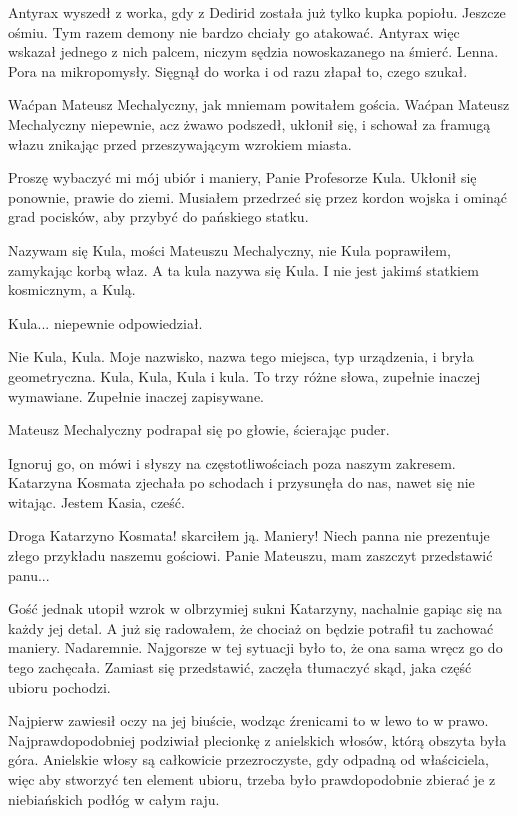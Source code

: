 Antyrax wyszedł z worka, gdy z Dedirid została już tylko kupka popiołu.
Jeszcze ośmiu.
Tym razem demony nie bardzo chciały go atakować.
Antyrax więc wskazał jednego z nich palcem, niczym sędzia nowoskazanego na śmierć.
Lenna. Pora na mikropomysły.
Sięgnął do worka i od razu złapał to, czego szukał.

\divider{}

\ds{} Waćpan Mateusz Mechalyczny, jak mniemam \dm{} powitałem gościa. \dm{} Waćpan Mateusz Mechalyczny niepewnie, acz żwawo podszedł, ukłonił się, i schował za framugą włazu
znikając przed przeszywającym wzrokiem miasta. \de{}

\ds{} Proszę wybaczyć mi mój ubiór i maniery, Panie Profesorze Kula. \dm{} Ukłonił się ponownie, prawie do ziemi. \dm{}
Musiałem przedrzeć się przez kordon wojska i ominąć grad pocisków, aby przybyć do pańskiego statku. \de{}

\ds{} Nazywam się Kula, mości Mateuszu Mechalyczny, nie Kula \dm{} poprawiłem, zamykając korbą właz. \dm{} A ta kula nazywa się Kula. 
I nie jest jakimś statkiem kosmicznym, a Kulą. \de{}

\ds{} Kula... \dm{} niepewnie odpowiedział. \de{}

\ds{} Nie Kula, Kula. Moje nazwisko, nazwa tego miejsca, typ urządzenia, i bryła geometryczna. Kula, Kula, Kula i kula. To trzy różne słowa, zupełnie inaczej wymawiane.
Zupełnie inaczej zapisywane. \de{}

Mateusz Mechalyczny podrapał się po głowie, ścierając puder.

\ds{} Ignoruj go, on mówi i słyszy na częstotliwościach poza naszym zakresem. \dm{} Katarzyna Kosmata zjechała po schodach i przysunęła do nas, nawet się nie witając.
\dm{} Jestem Kasia, cześć. \de{}

\ds{} Droga Katarzyno Kosmata! \dm{} skarciłem ją. \dm{} Maniery! Niech panna nie prezentuje złego przykładu naszemu gościowi. Panie Mateuszu, mam zaszczyt przedstawić panu...\de{}

Gość jednak utopił wzrok w olbrzymiej sukni Katarzyny, nachalnie gapiąc się na każdy jej detal.
A już się radowałem, że chociaż on będzie potrafił tu zachować maniery. Nadaremnie.
Najgorsze w tej sytuacji było to, że ona sama wręcz go do tego zachęcała. 
Zamiast się przedstawić, zaczęła tłumaczyć skąd, jaka część ubioru pochodzi.

Najpierw zawiesił oczy na jej biuście, wodząc źrenicami to w lewo to w prawo.
Najprawdopodobniej podziwiał plecionkę z anielskich włosów, którą obszyta była góra.
Anielskie włosy są całkowicie przezroczyste, gdy odpadną od właściciela, więc
aby stworzyć ten element ubioru, trzeba było prawdopodobnie zbierać je z niebiańskich podłóg w całym raju.


